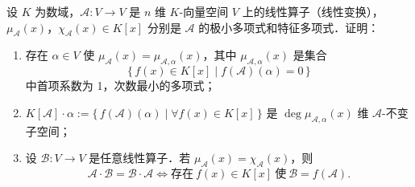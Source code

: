 设 $K$ 为数域，$\mathcal{A}:V\to V$ 是 $n$ 维 $K$-向量空间 $V$ 上的线性算子（线性变换），$\mu_{\mathcal{A}}(x)$，$\chi_{\mathcal{A}}(x)\in K[x]$ 分别是 $\mathcal{A}$ 的极小多项式和特征多项式．证明：
\begin{enumerate}[label=(\arabic*)]
  \item 存在 $\alpha\in V$ 使 $\mu_{\mathcal{A}}(x)=\mu_{\mathcal{A},\alpha}(x)$，其中 $\mu_{\mathcal{A},\alpha}(x)$ 是集合
  \[
    \{\,f(x)\in K[x]\mid f(\mathcal{A})(\alpha)=0\,\}
  \]
  中首项系数为 1，次数最小的多项式；
  \item $K[\mathcal{A}]\cdot\alpha:=\{\,f(\mathcal{A})(\alpha)\mid \forall f(x)\in K[x]\,\}$ 是 $\deg\mu_{\mathcal{A},\alpha}(x)$ 维 $\mathcal{A}$-不变子空间；
  \item 设 $\mathcal{B}:V\to V$ 是任意线性算子．若 $\mu_{\mathcal{A}}(x)=\chi_{\mathcal{A}}(x)$，则
  \[
    \mathcal{A}\cdot\mathcal{B}=\mathcal{B}\cdot\mathcal{A}
    \iff \text{存在}\ f(x)\in K[x]\ \text{使}\ \mathcal{B}=f(\mathcal{A}).
  \]
\end{enumerate}
